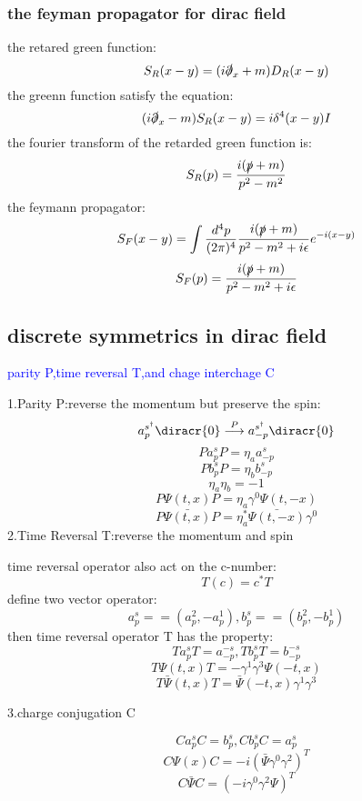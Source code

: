 \subsubsection{the feyman propagator for dirac field}
the retared green function:
\[S_R(x-y)=(i\slashed{\partial}_x+m)D_R(x-y)\]
the greenn function satisfy the equation:
\[(i\slashed{\partial}_x-m)S_R(x-y)=i\delta^4(x-y)I\]
the fourier transform of  the retarded green function is:
\[S_R(p)=\frac{i(\slashed{p}+m)}{p^2-m^2}\]
the feymann propagator:
\[S_F(x-y)=\int \frac{d^4p}{(2\pi)^4}\frac{i(\slashed{p}+m)}{p^2-m^2+i\epsilon}e^{-i(x-y)}\]
\[S_F(p)=\frac{i(\slashed{p}+m)}{p^2-m^2+i\epsilon}\]

\subsection{discrete symmetrics in dirac field}
\textcolor{blue}{parity P,time reversal T,and chage interchage C}\par
1.Parity P:reverse the momentum but preserve the spin:
\[a_p^{s^\dagger}\diracr{0}\stackrel{P}{\longrightarrow}a_{-p}^{s^\dagger}\diracr{0}\]
\[Pa_p^sP=\eta_a a_{-p}^s\]
\[Pb_p^sP=\eta_b b_{-p}^s\]
\[\eta_a\eta_b=-1\]
\[P\Psi(t,x)P=\eta_a\gamma^0\Psi(t,-x)\]
\[P\bar{\Psi(t,x)}P=\eta_a^*\bar{\Psi(t,-x)}\gamma^0\]
2.Time Reversal T:reverse the momentum and spin\par
time reversal operator also act on the c-number:
\[T(c)=c^*T\]
define two vector operator:
\[a_p^s==(a_p^2,-a_p^1),b_p^s==(b_p^2,-b_p^1)\]
then time reversal operator T has the property:
\[Ta_p^sT=a_{-p}^{-s},Tb_p^sT=b_{-p}^{-s}\]
\[T\Psi(t,x)T=-\gamma^1\gamma^3\Psi(-t,x)\]
\[T\bar{\Psi}(t,x)T=\bar{\Psi}(-t,x)\gamma^1\gamma^3\]

3.charge conjugation C\par
\[Ca_p^sC=b_p^s,Cb_p^sC=a_p^s\]
\[C\Psi(x)C=-i(\bar{\Psi}\gamma^0\gamma^2)^{T}\]
\[C\bar{\Psi}C=(-i\gamma^0\gamma^2\Psi)^{T}\]

